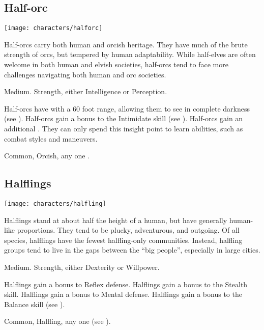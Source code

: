     \subsection{Half-orc}
        \texttt{[image: characters/halforc]}

        Half-orcs carry both human and orcish heritage.
        They have much of the brute strength of orcs, but tempered by human adaptability.
        While half-elves are often welcome in both human and elvish societies, half-orcs tend to face more challenges navigating both human and orc societies.

         Medium.
          Strength, either  Intelligence or  Perception.
        \begin{raggeditemize}
             Half-orcs have  with a 60 foot range, allowing them to see in complete darkness (see ).
             Half-orcs gain a  bonus to the Intimidate skill (see ).
             Half-orcs gain an additional .
                They can only spend this insight point to learn  abilities, such as combat styles and maneuvers.
        \end{raggeditemize}
         Common, Orcish, any one .

    \subsection{Halflings}
        \texttt{[image: characters/halfling]}

        Halflings stand at about half the height of a human, but have generally human-like proportions.
        They tend to be plucky, adventurous, and outgoing.
        Of all species, halflings have the fewest halfling-only communities.
        Instead, halfling groups tend to live in the gaps between the ``big people'', especially in large cities.

         Medium.
          Strength, either  Dexterity or  Willpower.
        \begin{raggeditemize}
             Halflings gain a  bonus to Reflex defense.
             Halflings gain a  bonus to the Stealth skill.
             Halflings gain a  bonus to Mental defense.
             Halflings gain a  bonus to the Balance skill (see ).
        \end{raggeditemize}
         Common, Halfling, any one  (see ).

